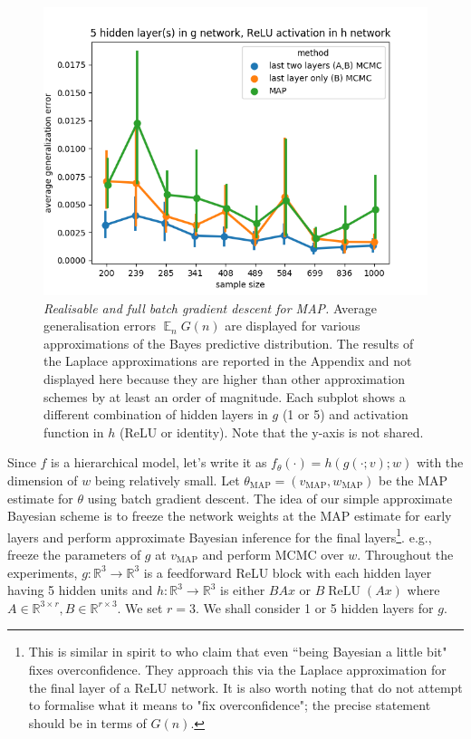 \documentclass[11pt]{article}
\DeclareMathOperator*{\E}{\operatorname{\mathbb{E}}}
\numberwithin{equation}{section}
\theoremstyle{plain}
\theoremstyle{definition}
\begin{document}
\begin{figure}[h!]
\begin{center}
		\includegraphics[scale=0.45]{taskid11.png}
	\end{center}
	\caption{\textit{Realisable and full batch gradient descent for MAP.} Average generalisation errors $\E_n G(n)$ are displayed for various approximations of the Bayes predictive distribution. The results of the Laplace approximations are reported in the Appendix and not displayed here because they are higher than other approximation schemes by at least an order of magnitude. Each subplot shows a different combination of hidden layers in $g$ (1 or 5) and activation function in $h$ (ReLU or identity). Note that the y-axis is not shared.
	}
	\label{fig:avg_gen_err_fullbatch_realisable}
\end{figure}




Since $f$ is a hierarchical model, let's write it as $f_\theta(\cdot) = h(g(\cdot;v);w)$ with the dimension of $w$ being relatively small. Let $\theta_{\operatorname{MAP}} = (v_{\operatorname{MAP}}, w_{\operatorname{MAP}})$ be the MAP estimate for $\theta$ using batch gradient descent. The idea of our simple approximate Bayesian scheme is to freeze the network weights at the MAP estimate for early layers and perform approximate Bayesian inference for the final layers\footnote{This is similar in spirit to \citet{kristiadi_being_2020} who claim that even ``being Bayesian a little bit" fixes overconfidence. They approach this via the Laplace approximation for the final layer of a ReLU network. It is also worth noting that \citet{kristiadi_being_2020} do not attempt to formalise what it means to "fix overconfidence"; the precise statement should be in terms of $G(n)$.}. e.g., freeze the parameters of $g$ at $v_{\operatorname{MAP}}$ and perform MCMC over $w$. 
Throughout the experiments, $g: \mathbb R^3 \to \mathbb R^3$ is a feedforward ReLU block with each hidden layer having 5 hidden units and $h: \mathbb R^3 \to \mathbb R^3$ is either $BAx$ or $B \operatorname{ReLU}(Ax)$ where $A \in \mathbb R^{3 \times r}, B \in \mathbb R^{r \times 3}$. We set $r=3$. We shall consider 1 or 5 hidden layers for $g$. 
\end{document}
